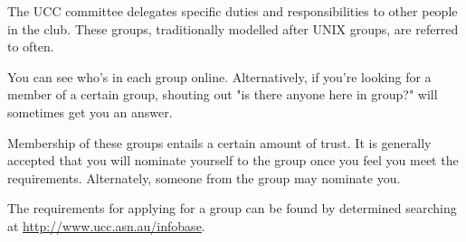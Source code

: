 
\newenvironment{uccgroup}[1]
{
	\begin{mdframed}
	\section{\textsc{#1}}
	\begin{mdframed}
		Contact: <\href{mailto:#1@ucc.asn.au}{#1@ucc.asn.au}>
	\end{mdframed}
	\begin{mdframed}
		Members: \small{\url{http://www.ucc.asn.au/infobase/groups/#1.ucc}}
	\end{mdframed}

	

}{\end{mdframed}}

\begin{mdframed}
The UCC committee delegates specific duties and responsibilities to other people in the club. These groups, traditionally modelled after UNIX groups, are referred to often.

You can see who's in each group online. Alternatively, if you're looking for a member of a certain group, shouting out "is there anyone here in group?" will sometimes get you an answer.


Membership of these groups entails a certain amount of trust. It is generally accepted that you will nominate yourself to the group once you feel you meet the requirements. Alternately, someone from the group may nominate you.

The requirements for applying for a group can be found by determined searching at \url{http://www.ucc.asn.au/infobase}.



\end{mdframed}

